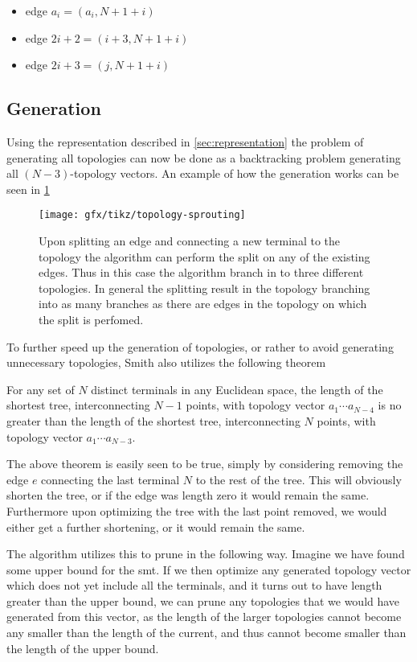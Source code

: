 \begin{itemize}
\item edge $a_{i} = (a_{i},N+1+i)$
\item edge $ 2i + 2 = (i+3,N+1+i)$
\item edge $ 2i + 3 = (j,N+1+i)$
\end{itemize}

\subsection{Generation}
\label{sec:generation}

Using the representation described in \cref{sec:representation} the problem of
generating all topologies can now be done as a backtracking problem generating
all $(N-3)$-topology vectors.  An example of how the generation works can be seen
in \cref{fig:topology-sprouting}

\begin{figure}[htbp]
  \centering
  \texttt{[image: gfx/tikz/topology-sprouting]}
  \caption{Upon splitting an edge and connecting a new terminal to the topology
    the algorithm can perform the split on any of the existing edges.  Thus in
    this case the algorithm branch in to three different topologies.  In general
    the splitting result in the topology branching into as many branches as
    there are edges in the topology on which the split is perfomed.\label{fig:topology-sprouting}}
\end{figure}

To further speed up the generation of topologies, or rather to avoid generating
unnecessary topologies, Smith also utilizes the following theorem
%
\begin{theorem}
  For any set of $N$ distinct terminals in any Euclidean space, the length of
  the shortest tree, interconnecting $N-1$ points, with topology vector
  $a_1 \cdots a_{N-4}$ is no greater than the length of the shortest tree,
  interconnecting $N$ points, with topology vector $a_1 \cdots a_{N-3}$.
\end{theorem}
%
The above theorem is easily seen to be true, simply by considering removing the
edge $e$ connecting the last terminal $N$ to the rest of the tree.  This will
obviously shorten the tree, or if the edge was length zero it would remain the
same.  Furthermore upon optimizing the tree with the last point removed, we
would either get a further shortening, or it would remain the same.

The algorithm utilizes this to prune in the following way.  Imagine we have
found some upper bound for the \gls{smt}.  If we then optimize any generated
topology vector which does not yet include all the terminals, and it turns out
to have length greater than the upper bound, we can prune any topologies that we
would have generated from this vector, as the length of the larger topologies
cannot become any smaller than the length of the current, and thus cannot become
smaller than the length of the upper bound.

